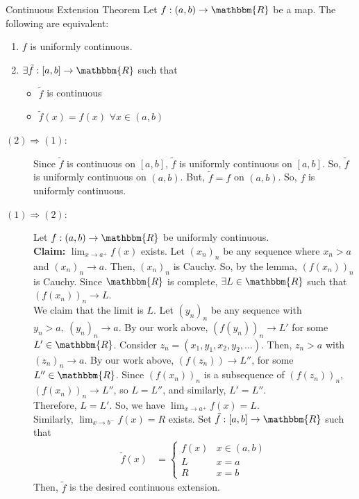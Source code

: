 \documentclass[10pt]{extarticle}
\newcommand{\R}{\mathbbm{R}}
\begin{document}
  \begin{problem}{Continuous Extension Theorem}
    Let $f: (a,b) \rightarrow \R$ be a map. The following are equivalent:
    \begin{enumerate}[(1)]
      \item $f$ is uniformly continuous.
      \item $\exists \tilde{f}: [a,b] \rightarrow \R$ such that
        \begin{itemize}
          \item $\tilde{f}$ is continuous
          \item $\tilde{f}(x) = f(x)$ $\forall x\in (a,b)$
        \end{itemize}
    \end{enumerate}
    \tcblower
    \begin{description}
      \item[$(2) \Rightarrow (1)$:] Since $\tilde{f}$ is continuous on $[a,b]$, $\tilde{f}$ is uniformly continuous on $[a,b]$. So, $\tilde{f}$ is uniformly continuous on $(a,b)$. But, $\tilde{f} = f$ on $(a,b)$. So, $f$ is uniformly continuous.
      \item[$(1) \Rightarrow (2)$:] Let $f: (a,b) \rightarrow \R$ be uniformly continuous.\\

        \textbf{Claim:} $\lim_{x\rightarrow a^{+}}f(x)$ exists. Let $(x_n)_n$ be any sequence where $x_n > a$ and $(x_n)_n \rightarrow a$. Then, $(x_n)_n$ is Cauchy. So, by the lemma, $(f(x_n))_n$ is Cauchy. Since $\R$ is complete, $\exists L\in \R$ such that $\left(f(x_n)\right)_n \rightarrow L$.\\

        We claim that the limit is $L$. Let $(y_n)_n$ be any sequence with $y_n > a,~(y_n)_n\rightarrow a$. By our work above, $\left(f(y_n)\right)_n \rightarrow L'$ for some $L'\in \R$. Consider $z_n = (x_1,y_1,x_2,y_2,\dots)$. Then, $z_n > a$ with $(z_n)_n \rightarrow a$. By our work above, $\left(f(z_n)\right) \rightarrow L''$, for some $L''\in \R$. Since $(f(x_n))_n$ is a subsequence of $(f(z_n))_n$, $\left(f(x_n)\right)_n \rightarrow L''$, so $L = L''$, and similarly, $L' = L''$.\\

        Therefore, $L = L'$. So, we have $\lim_{x\rightarrow a^+} f(x) = L$.\\

        Similarly, $\lim_{x\rightarrow b^-}f(x) = R$ exists. Set $\tilde{f}: [a,b] \rightarrow \R$ such that
        \begin{align*}
          \tilde{f}(x) &= \begin{cases}
            f(x) & x\in (a,b)\\
            L & x=a\\
            R & x=b
          \end{cases}
        \end{align*}
        Then, $\tilde{f}$ is the desired continuous extension.
    \end{description}
  \end{problem}
\end{document}
